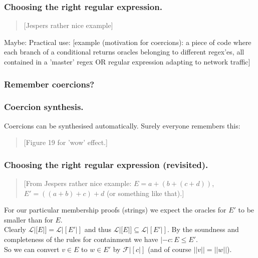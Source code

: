 \documentclass[slidestop,compress,mathserif, xcolor=table]{beamer}
\begin{document}
\begin{frame}
  \frametitle{Choosing the right regular expression.}

  \begin{quote}
    [Jespers rather nice example]
  \end{quote}
\end{frame}

\begin{frame}
  Maybe: Practical use:
  [example (motivation for coercions): a piece of code where each branch of a
  conditional returns oracles belonging to different regex'es, all contained in a
  'master' regex OR regular expression adapting to network traffic]
\end{frame}

\begin{frame}
  \frametitle{Remember coercions?}
\end{frame}

\begin{frame}
  \frametitle{Coercion synthesis.}
  Coercions can be synthesised automatically. Surely everyone remembers this:

  \begin{quote}
    [Figure 19 for 'wow' effect.]
  \end{quote}
\end{frame}

\begin{frame}
  \frametitle{Choosing the right regular expression (revisited).}

  \begin{quote}
    [From Jespers rather nice example: $E = a + (b + (c + d))$, $E' = ((a + b) +
    c) + d$ (or something like that).]
  \end{quote}
  For our particular membership proofs (strings) we expect the oracles for $E'$
  to be smaller than for $E$.\\[1em]

  Clearly $\mathcal{L}|[E|] = \mathcal{L}|[E'|]$ and thus $\mathcal{L}|[E|]
  \subseteq \mathcal{L}|[E'|]$. By the soundness and completeness of the rules
  for containment we have $|- c : E \leq E'$.\\[1em]

  So we can convert $v \in E$ to $w \in E'$ by $\mathcal{F}|[c|]$ (and of course
  $||v|| = ||w||$).
\end{frame}
\end{document}
